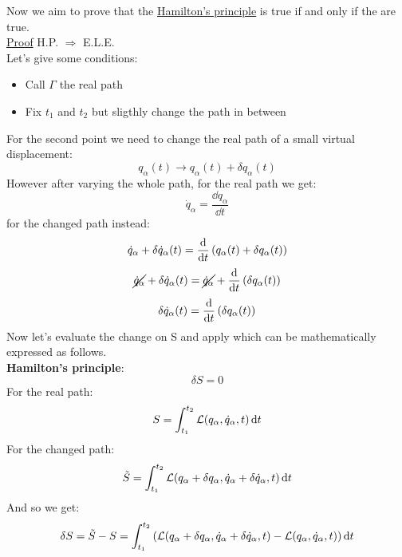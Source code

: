 Now we aim to prove that the \hyperref[q:Hamilton_principle_quote]{Hamilton's principle} is true if and only if the \eleref\;are true.\\
\underline{Proof} H.P. $\Rightarrow$ E.L.E.\\
Let's give some conditions:
\begin{itemize}
    \item Call $\Gamma$ the real path
    \item Fix $t_1$ and $t_2$ but sligthly change the path in between
\end{itemize}
For the second point we need to change the real path of a small virtual displacement:
\begin{equation}
    q_{\alpha}(t) \longrightarrow q_{\alpha}(t) + \delta q_{\alpha}(t)
\end{equation}
However after varying the whole path, for the real path we get:
\begin{equation}
    \dot{q}_{\alpha} = \dfrac{\dd{q_{\alpha}}}{\dd{t}}
\end{equation}
for the changed path instead:
\begin{equation}
    \dot{q}_{\alpha} + \delta \dot{q}_{\alpha}(t) = \dv{}{t}\brackets{q_{\alpha}(t) + \delta q_{\alpha}(t)}
\end{equation}
\begin{equation}
    \cancel{\dot{q}_{\alpha}} + \delta \dot{q}_{\alpha}(t) = \cancel{\dot{q}_{\alpha}} + \dv{}{t}\brackets{\delta q_{\alpha}(t)}
\end{equation}
\begin{equation}
    \delta \dot{q}_{\alpha}(t) = \dv{}{t}\brackets{\delta q_{\alpha}(t)}
\end{equation}
Now let's evaluate the change on S and apply \hpquoteref\;which can be mathematically expressed as follows.\\\textbf{Hamilton's principle}:
\begin{equation} \label{e:Hamilton_principle}
    \delta S = 0
\end{equation}
For the real path:
\begin{equation}
    S = \int_{t_1}^{t_2}\mathcal{L}(q_{\alpha},\dot{q}_{\alpha},t) \dd{t}
\end{equation}
For the changed path:
\begin{equation}
    \tilde{S} = \int_{t_1}^{t_2}\mathcal{L}(q_{\alpha}+\delta q_{\alpha},\dot{q}_{\alpha} + \delta \dot{q}_{\alpha},t) \dd{t}
\end{equation}
And so we get:
\begin{equation}
    \delta S = \tilde{S} - S = \int_{t_1}^{t_2}\left(\mathcal{L}(q_{\alpha}+\delta q_{\alpha},\dot{q}_{\alpha} + \delta \dot{q}_{\alpha},t) - \mathcal{L}(q_{\alpha},\dot{q}_{\alpha},t)\right) \dd{t}
\end{equation}
